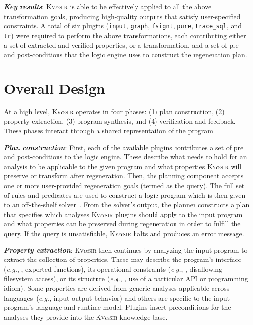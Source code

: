 \documentclass[nonacm,sigplan,review]{acmart}
\def\eg{{\em e.g.}, }
\newcommand{\sys}{{\scshape Kv{$\alpha$}sir}\xspace}
\newcommand{\heading}[1]{\vspace{2pt}\noindent\textbf{\emph{#1}}:\enspace}
\newcommand{\ttt}[1]{\texttt{#1}\xspace}
\begin{document}
\heading{Key results}
\sys is able to be effectively applied to all the above transformation goals,
producing high-quality outputs that satisfy user-specified constraints.
A total
of six plugins (\ttt{input}, \ttt{graph}, \ttt{fsignt}, \ttt{pure}, \ttt{trace\_sql}, and \ttt{tr})
were required to perform the above transformations, each
contributing either a set of extracted and verified properties, or a
transformation, and a set of pre- and post-conditions that the logic engine
uses to construct the regeneration plan.

\section{Overall Design}
\label{sec:design}

At a high level, \sys operates in four phases: (1) plan construction, (2)
property extraction, (3) program synthesis, and (4) verification and feedback.
These phases interact through a shared representation of the program.

\heading{Plan construction}
First, each of the available plugins contributes a set of pre and post-conditions 
to the logic engine.
These describe what needs to hold for an analysis to be applicable to the given 
program and what properties \sys will preserve or transform after regeneration.
Then, the planning component accepts one or more user-provided regeneration goals (termed as the query).
The full set of rules and predicates are used to construct a logic program
which is then given to an off-the-shelf solver~\cite{gebser2007clasp}.
From the solver's output, the planner constructs a plan that specifies which
analyses \sys plugins should apply to the input program and what properties can be
preserved during regeneration in order to fulfill the query.
If the query is unsatisfiable, \sys halts and produces an error message.

\heading{Property extraction} \sys then continues by analyzing the input program to
extract the collection of properties.
These may describe the program's interface
(\eg, exported functions), its operational constraints (\eg, disallowing
filesystem access), or its structure (\eg, use of a particular API or programming idiom).
Some properties are derived from generic analyses
applicable across languages~(\eg input-output behavior) 
and others are specific to the input program's language and runtime model.
Plugins insert preconditions for the analyses they provide into the \sys knowledge base.
\end{document}
